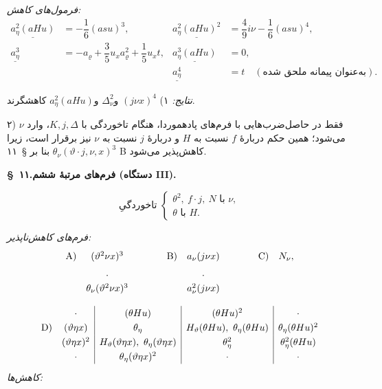 \documentclass[11pt]{article}
\providecommand{\A}{\Delta}
\providecommand{\R}{\varrho}
\begin{document}
\noindent\emph{فرمول‌های کاهش:}
\[
\tag{11}
\begin{array}{rl|rl}
\underline{a_\eta^2(aHu)}&=-\dfrac16(asu)^3,&
\underline{a_\eta^2(aHu)^2}&=\dfrac49 i \nu-\dfrac16(asu)^4,\\[0.7em]
\underline{a_\eta^3}&=-a_\R+\dfrac35u_xa_\R^2+\dfrac15u_xt,
&\underline{a_\eta^3(aHu)}&=0,\\[0.7em]
&&\underline{a_\eta^4}&=t\quad(\text{به‌عنوان پیمانه ملحق شده}).
\end{array}
\]

\noindent\emph{نتایج:}
۱) $(j\nu x)^4$ و$\A_\nu^2$ و$a_\eta^2(aHu)$ کاهشگرند.

۲) $\nu$ فقط در حاصل‌ضرب‌هایی با فرم‌های پادهموردا، هنگام تاخوردگی با $K,j,\A$، وارد می‌شود؛ همین حکم دربارهٔ $f$ نسبت به $H$ و دربارهٔ $j$ نسبت به $\nu$ نیز برقرار است، زیرا $\theta_\nu(\vartheta\cdot j,\nu,x)^3$ بنا بر \S\ ۱۱ B کاهش‌پذیر می‌شود.

\begin{center}
\textbf{\S\ ۱۱.\quad فرم‌های مرتبهٔ ششم (دستگاه III).}
\end{center}
\[
\text{تاخوردگیِ }\left\{\begin{array}{l}
\theta^2,\ f\cdot j,\ N \text{ با }\nu,\\
\theta\text{ با }H.
\end{array}\right.
\]


\noindent\emph{فرم‌های کاهش‌ناپذیر:}
\[
\renewcommand{\arraystretch}{1.25}
\begin{array}{@{}r@{\quad}c@{\qquad\qquad}r@{\quad}c@{\qquad\qquad}r@{\quad}c@{}}
\text{A)}&(\vartheta^2\nu x)^3&\text{B)}&a_\nu(j\nu x)&\text{C)}&N_\nu,\\[0.45em]
&\cdot&&\cdot&&\\[-0.1em]
&\theta_\nu(\vartheta^2\nu x)^3&&a_\nu^2(j\nu x)&&
\end{array}
\]

\[
\renewcommand{\arraystretch}{1.25}
\begin{array}{@{}r@{\quad}c|c|c|c@{}}
&\cdot&(\theta Hu)&(\theta Hu)^2&\cdot\\
\text{D)}&(\vartheta\eta x)&\theta_\eta&H_\vartheta(\theta Hu),\ \theta_\eta(\theta Hu)&\theta_\eta(\theta Hu)^2\\
&(\vartheta\eta x)^2&H_\vartheta(\vartheta\eta x),\ \theta_\eta(\vartheta\eta x)&\theta_\eta^2&\theta_\eta^2(\theta Hu)\\
&\cdot&\theta_\eta(\vartheta\eta x)^2&\cdot&\cdot
\end{array}
\]
\noindent\emph{کاهش‌ها:}
\end{document}
